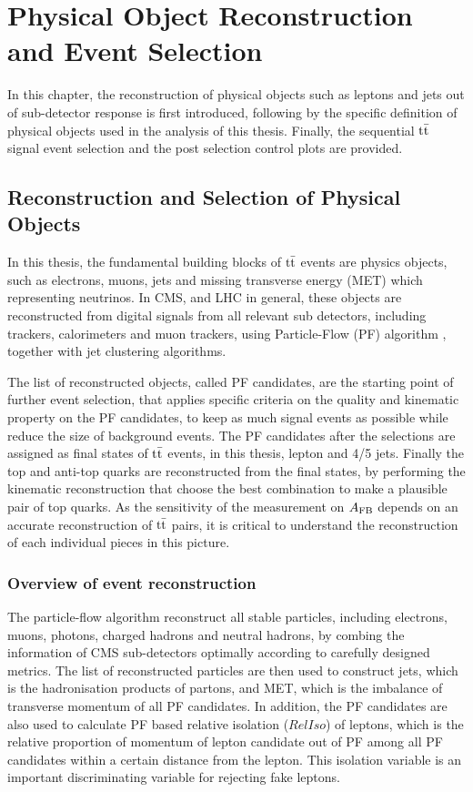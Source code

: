\chapter{Physical Object Reconstruction and Event Selection}
\label{sec:objects}

In this chapter, the reconstruction of physical objects such as leptons and jets out of sub-detector response is first introduced, following by the specific definition of physical objects used in the analysis of this thesis. Finally, the sequential $\mathrm{t}\bar{\mathrm{t}}$ signal event selection and the post selection control plots are provided.


\section{Reconstruction and Selection of Physical Objects}
\label{sec:Reco}

In this thesis, the fundamental building blocks of $\mathrm{t}\bar{\mathrm{t}}$ events are physics objects, such as electrons, muons, jets and missing transverse energy (MET) which representing neutrinos. In CMS, and LHC in general, these objects are reconstructed from digital signals from all relevant sub detectors, including trackers, calorimeters and muon trackers, using Particle-Flow (PF) algorithm \cite{CMS-PF-09}, together with jet clustering algorithms.


The list of reconstructed objects, called PF candidates, are the starting point of further event selection, that applies specific criteria on the quality and kinematic property on the PF candidates, to keep as much signal events as possible while reduce the size of background events. The PF candidates after the selections are assigned as final states of $\mathrm{t}\bar{\mathrm{t}}$ events, in this thesis, lepton and 4/5 jets. Finally the top and anti-top quarks are reconstructed from the final states, by performing the kinematic reconstruction that choose the best combination to make a plausible pair of top quarks. As the sensitivity of the measurement on $A_{\mathrm{FB}}$ depends on an accurate reconstruction of $\mathrm{t}\bar{\mathrm{t}}$ pairs, it is critical to understand the reconstruction of each individual pieces in this picture.


\subsection{Overview of event reconstruction}

The particle-flow algorithm reconstruct all stable particles, including electrons, muons, photons, charged hadrons and neutral hadrons, by combing the information of CMS sub-detectors optimally according to carefully designed metrics. The list of reconstructed particles are then used to construct jets, which is the hadronisation products of partons, and MET, which is the imbalance of transverse momentum of all PF candidates. In addition, the PF candidates are also used to calculate PF based relative isolation ($RelIso$) of leptons, which is the relative proportion of momentum of lepton candidate out of PF among all PF candidates within a certain distance from the lepton. This isolation variable is an important discriminating variable for rejecting fake leptons. 

